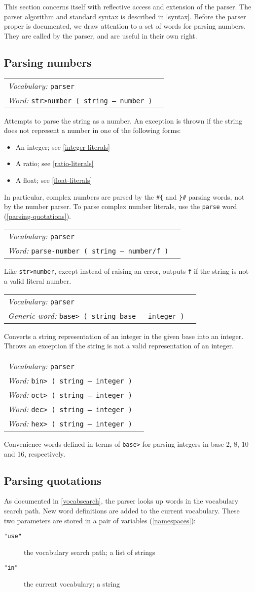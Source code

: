 \documentclass{book}
\newcommand{\vocabulary}[1]{\emph{Vocabulary:} \texttt{#1}&\\}
\newcommand{\ordinaryword}[2]{\index{\texttt{#1}}\emph{Word:} \texttt{#2}&\\}
\newcommand{\genericword}[2]{\index{\texttt{#1}}\emph{Generic word:} \texttt{#2}&\\}
\newcommand{\wordtable}[1]{

\begin{tabularx}{12cm}[t]{lX}
\hline
#1
\hline
\end{tabularx}

}
\begin{document}
This section concerns itself with reflective access and extension of the parser. The parser algorithm and standard syntax is described in \ref{syntax}. Before the parser proper is documented, we draw attention to a set of words for parsing numbers. They are called by the parser, and are useful in their own right.

\subsection{\label{parsing-numbers}Parsing numbers}

\wordtable{
\vocabulary{parser}
\ordinaryword{str>number}{str>number~( string -- number )}
}
Attempts to parse the string as a number. An exception is thrown if the string does not represent a number in one of the following forms:
\begin{itemize}
\item An integer; see \ref{integer-literals}
\item A ratio; see \ref{ratio-literals}
\item A float; see \ref{float-literals}
\end{itemize}
In particular, complex numbers are parsed by the \verb|#{| and \verb|}#| parsing words, not by the number parser. To parse complex number literals, use the \texttt{parse} word (\ref{parsing-quotations}).
\wordtable{
\vocabulary{parser}
\ordinaryword{parse-number}{parse-number~( string -- number/f )}
}
Like \texttt{str>number}, except instead of raising an error, outputs \texttt{f} if the string is not a valid literal number.
\wordtable{
\vocabulary{parser}
\genericword{base>}{base>~( string base -- integer )}
}
Converts a string representation of an integer in the given base into an integer. Throws an exception if the string is not a valid representation of an integer.
\wordtable{
\vocabulary{parser}
\ordinaryword{bin>}{bin>~( string -- integer )}
\ordinaryword{oct>}{oct>~( string -- integer )}
\ordinaryword{dec>}{dec>~( string -- integer )}
\ordinaryword{hex>}{hex>~( string -- integer )}
}
Convenience words defined in terms of \texttt{base>} for parsing integers in base 2, 8, 10 and 16, respectively.

\subsection{\label{parsing-quotations}Parsing quotations}

As documented in \ref{vocabsearch}, the parser looks up words in the vocabulary search path. New word definitions are added to the current vocabulary. These two parameters are stored in a pair of variables (\ref{namespaces}):
\begin{description}
\item[\texttt{"use"}] the vocabulary search path; a list of strings
\item[\texttt{"in"}] the current vocabulary; a string
\end{description}
\end{document}
